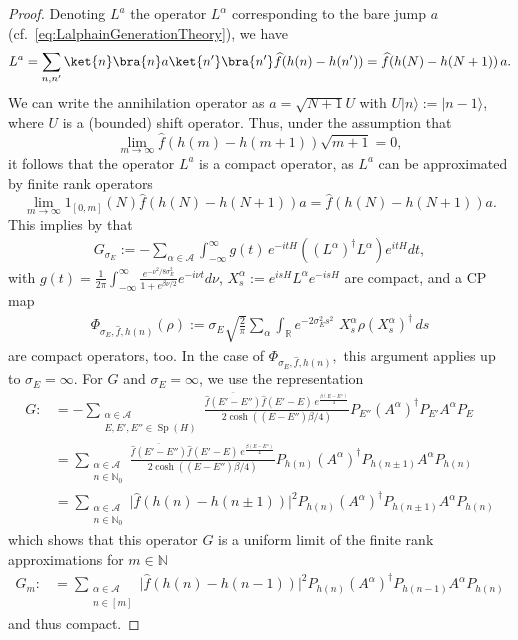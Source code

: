\documentclass[11pt]{amsart}
\newcommand{\1}{\mathbbm{1}}
\newcommand{\E}{\mathbb{E}}
\newcommand{\spec}{\operatorname{Sp}}
\theoremstyle{plain}
\theoremstyle{definition}
\theoremstyle{remark}
\numberwithin{equation}{section}
\begin{document}
\begin{proof}
Denoting $L^a$ the operator $L^\alpha$ corresponding to the bare jump $a$ (cf.~\eqref{eq:LalphainGenerationTheory}), we have 
\[L^a  =\sum_{n,n'}\ket{n}\bra{n}a\ket{n'}\bra{n'}\widehat{f}(h(n)-h(n'))=\widehat{f}(h(N)-h(N+1))\, a.  \]
We can write the annihilation operator as $a=\sqrt{N+1} U$ with $U\vert n\rangle := \vert n-1 \rangle$, where $U$ is a (bounded) shift operator.
Thus, under the assumption that 
\[ \lim_{m \to \infty} \widehat{f}(h(m)-h(m+1)) \sqrt{m+1}=0, \]
it follows that the operator $L^a$ is a compact operator, as $L^a$ can be approximated by finite rank operators 
\[\lim_{m \to \infty} 1_{[0,m]}(N)\widehat{f}(h(N)-h(N+1)) a =\widehat{f}(h(N)-h(N+1)) a.\]
This implies by \cite[Theorem C.7]{engel1999one} that  \begin{align*}
 G_{\sigma_E}:=-\sum_{\alpha\in\mathcal{A}}\int_{-\infty}^\infty g(t)\,e^{-itH}((L^{\alpha})^\dagger L^\alpha)e^{itH}dt,
\end{align*}
with 
$g(t)=\frac{1}{2\pi}\int_{-\infty}^\infty \frac{e^{-\nu^2/8\sigma_E^2}}{1+e^{\beta\nu/2}} e^{-i\nu t}d\nu$, $X^{\alpha}_s:=e^{isH}L^\alpha e^{-isH}$ are compact, and a CP map 
\begin{align*}
\Phi_{\sigma_E,\widehat{f},h(n)}(\rho):=\sigma_E\sqrt{\frac{2}{\pi}}\sum_{\alpha}\int_{\mathbb{R}}e^{-2\sigma_E^2 s^2}\, \, X_s^{\alpha} \rho (X_s^\alpha)^\dagger \,ds
\end{align*}
are compact operators, too. In the case of $\Phi_{\sigma_E,\hat{f},h(n)},$ this argument applies up to $\sigma_E=\infty.$ For $G$ and $\sigma_E=\infty$, we use the representation
\begin{equation}
    \begin{split}
G:&=-\sum_{\substack{\alpha\in \mathcal{A}\\E,E',E''\in\spec(H)}}  \frac{\overline{\widehat{f}(E'-E'')}\widehat{f}(E'-E)\,e^{\frac{\beta(E-E'')}{4}}}{2\cosh((E-E'')\beta/4)}P_{E''}\left(A^\alpha\right)^\dagger P_{E'} A^\alpha P_E \\
&=\sum_{\substack{\alpha\in \mathcal{A}\\n \in \mathbb N_0}}  \frac{\overline{\widehat{f}(E'-E'')}\widehat{f}(E'-E)\,e^{\frac{\beta(E-E'')}{4}}}{2\cosh((E-E'')\beta/4)}P_{h(n)}\left(A^\alpha\right)^\dagger P_{h(n\pm 1)} A^\alpha P_{h(n)} \\
&=\sum_{\substack{\alpha\in \mathcal{A}\\n \in \mathbb N_0}}  \vert\widehat{f}(h(n)-h(n\pm 1))\vert^2P_{h(n)}\left(A^\alpha\right)^\dagger P_{h(n\pm 1)} A^\alpha P_{h(n)}
    \end{split}
\end{equation}
which shows that this operator $G$ is a uniform limit of the finite rank approximations for $m \in \mathbb N$
\begin{equation}
    \begin{split}
G_m:
&=\sum_{\substack{\alpha\in \mathcal{A}\\n \in [m]}}  \vert\widehat{f}(h(n)-h(n-1))\vert^2P_{h(n)}\left(A^\alpha\right)^\dagger P_{h(n-1)} A^\alpha P_{h(n)}
    \end{split}
\end{equation}
and thus compact.


\end{proof}
\end{document}
